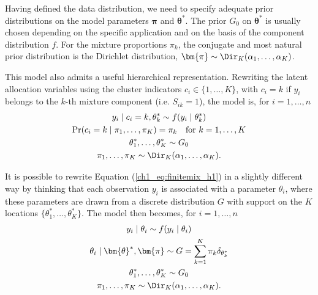Having defined the data distribution, we need to specify adequate prior distributions on the model parameters $\bm{\pi}$ and $\bm{\theta}^*$. The prior $G_0$ on $\bm{\theta}^*$ is usually chosen depending on the specific application and on the basis of the component distribution $f$. For the mixture proportions $\pi_k$, the conjugate and most natural prior distribution is the Dirichlet distribution, $\bm{\pi}\sim \Dir_K(\alpha_1,\dots,\alpha_K)$.

This model also admits a useful hierarchical representation. Rewriting the latent allocation variables using the cluster indicators $c_i\in\{1,\dots,K\}$, with $c_i=k$ if $y_i$ belongs to the $k$-th mixture component (i.e. $S_{ik} = 1$), the model is, for $i = 1,\dots,n$ 
\begin{equation}
\begin{gathered}
y_i \mid c_i = k, \theta^*_k \sim f(y_i\mid\theta^*_k)\\
\Pr(c_i = k \mid \pi_1,\dots,\pi_K) = \pi_k \quad \text{for } k = 1,\dots,K\\ 
\theta^*_1,\dots,\theta^*_K \sim G_0\\
\pi_1,\dots,\pi_K  \sim \Dir_K(\alpha_1,\dots,\alpha_K).
\end{gathered}
\label{ch1_eq:finitemix_h1}
\end{equation}

It is possible to rewrite Equation (\ref{ch1_eq:finitemix_h1}) in a slightly different way by thinking that each observation $y_i$ is associated with a parameter $\theta_i$, where these parameters are drawn from a discrete distribution $G$ with support on the $K$ locations $\{\theta^*_1,\dots,\theta^*_K\}$. The model then becomes, for $i=1,\dots,n$
\begin{equation}
\begin{gathered}
y_i \mid \theta_i \sim f(y_i\mid\theta_i)\\
\theta_i \mid \bm{\theta}^*,\bm{\pi} \sim G = \sum_{k=1}^K \pi_k \delta_{\theta^*_k}\\
\theta^*_1,\dots,\theta^*_K \sim G_0\\
\pi_1,\dots,\pi_K \sim \Dir_K(\alpha_1,\dots,\alpha_K).
\end{gathered}
\label{ch1_eq:finitemix_h2}
\end{equation}

